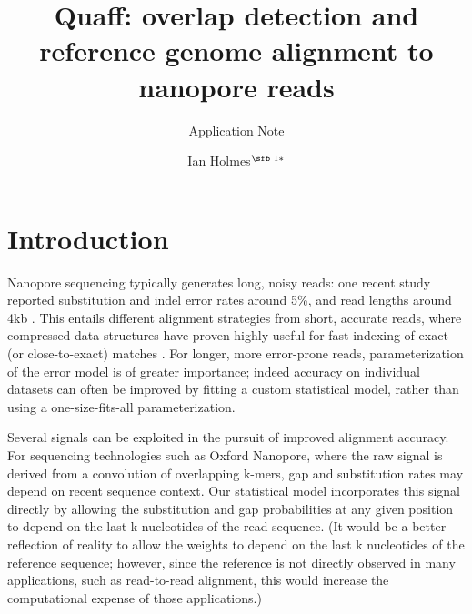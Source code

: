 \documentclass{bioinfo}
\begin{document}

\subtitle{Application Note}

\title[Quaff: alignment to nanopore reads]{Quaff: overlap detection and reference genome alignment to nanopore reads}
\author[Ian Holmes]{Ian Holmes$^{\text{\sfb 1}*}$}
\address{$^{\text{\sf 1}}$Department of Bioengineering, University of California, Berkeley, 94703, USA.}





\maketitle

\section{Introduction}

Nanopore sequencing typically generates long, noisy reads: one recent study reported substitution and indel error rates around 5\%, and read lengths around 4kb \citep{Jain2015-by}. This entails different alignment strategies from short, accurate reads, where compressed data structures have proven highly useful for fast indexing of exact (or close-to-exact) matches \citep{Lindner2012-tx}. For longer, more error-prone reads, parameterization of the error model is of greater importance; indeed accuracy on individual datasets can often be improved by fitting a custom statistical model, rather than using a one-size-fits-all parameterization.

Several signals can be exploited in the pursuit of improved alignment accuracy. For sequencing technologies such as Oxford Nanopore, where the raw signal is derived from a convolution of overlapping k-mers, gap and substitution rates may depend on recent sequence context. Our statistical model incorporates this signal directly by allowing the substitution and gap probabilities at any given position to depend on the last k nucleotides of the read sequence. (It would be a better reflection of reality to allow the weights to depend on the last k nucleotides of the reference sequence; however, since the reference is not directly observed in many applications, such as read-to-read alignment, this would increase the computational expense of those applications.)
\end{document}
